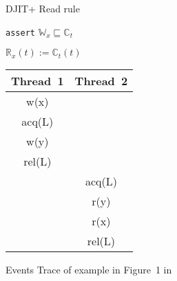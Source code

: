 \begin{refsection}
\begin{figure}
  \begin{minipage}[b]{0.28\textwidth}
    \centering
    \begin{algorithm}[H]
      \caption{DJIT+ Read rule}
      \label{alg:djit}
      \begin{algorithmic}

        \texttt{assert} $\mathbb{W}_x \sqsubseteq \mathbb{C}_t$

        $\mathbb{R}_x(t) := \mathbb{C}_t(t)$
        \EndIf
      \end{algorithmic}
    \end{algorithm}
    \phantom{1}
    \phantom{2}
    \phantom{3}
    \phantom{4}
    \begin{tabular}{c c}
      Thread~1 & Thread~2 \\
      \hline
      w(x)   & \\
      acq(L) & \\
      w(y)   & \\
      rel(L) & \\
               & acq(L) \\
               & r(y) \\
               & r(x) \\
               & rel(L) \\
      \hline
    \end{tabular}
    \caption{Events Trace of example in Figure~1 in~\cite{Sen:2008:RDR:1375581.1375584}}
    \label{fig:execution1}
  \end{minipage}
  \hfill
  \begin{minipage}[b]{0.7\textwidth}
\end{minipage}
\end{figure}
\end{refsection}
